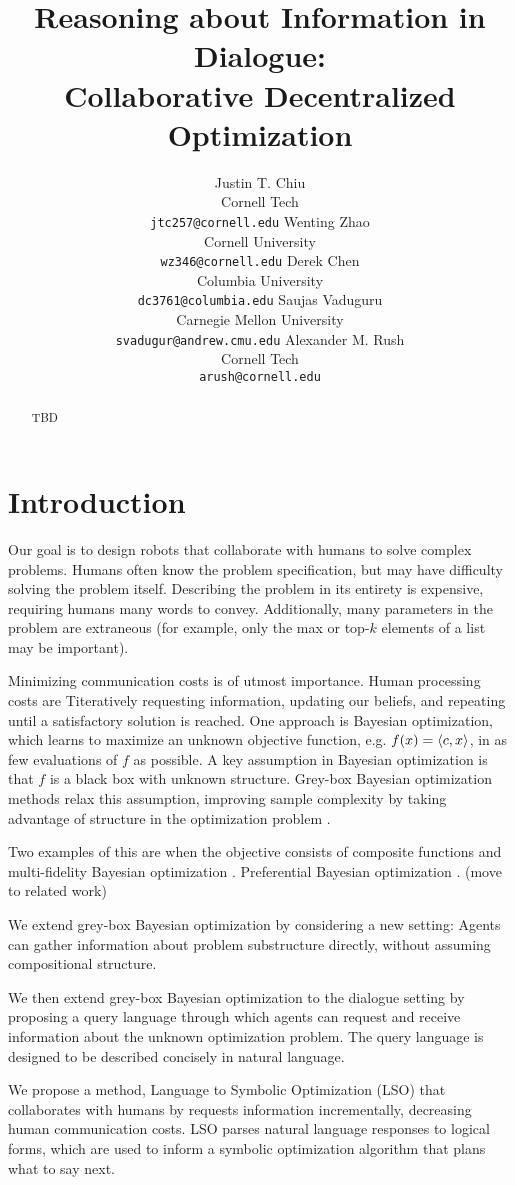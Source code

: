\documentclass[11pt]{article}
\title{
Reasoning about Information in Dialogue:\\
Collaborative Decentralized Optimization
}
\author{
Justin T. Chiu  \\
Cornell Tech \\
\texttt{jtc257@cornell.edu}
\And
Wenting Zhao \\
Cornell University \\
\texttt{wz346@cornell.edu}
\And
Derek Chen \\
Columbia University \\
\texttt{dc3761@columbia.edu}
\AND
Saujas Vaduguru \\
Carnegie Mellon University \\
\texttt{svadugur@andrew.cmu.edu}
\And
Alexander M. Rush \\
Cornell Tech \\
\texttt{arush@cornell.edu}
}
\begin{document}
\maketitle

\begin{abstract}
TBD
\end{abstract}

\section{Introduction}
Our goal is to design robots that collaborate with humans to solve complex problems.
Humans often know the problem specification, but may have difficulty solving the problem itself.
Describing the problem in its entirety is expensive, requiring humans many words to convey.
Additionally, many parameters in the problem are extraneous (for example, only the max or top-$k$ elements of a list may be important).

Minimizing communication costs is of utmost importance.
Human processing costs are 
Titeratively requesting information, updating our beliefs, and repeating until a satisfactory solution is reached.
One approach is Bayesian optimization, which learns to maximize an unknown objective function,
e.g. $f(x) = \left\langle c,x\right\rangle$, in as few evaluations of $f$ as possible.
A key assumption in Bayesian optimization is that $f$ is a black box with unknown structure.
Grey-box Bayesian optimization methods relax this assumption, improving sample complexity by taking advantage of structure in the optimization problem \citep{grey-box-bayesopt}.

Two examples of this are when the objective consists of composite functions \citep{astudillo2019bayesian} and multi-fidelity Bayesian optimization \citep{poloczek2016multiinformation,Zanjani_Foumani_2023}. 
Preferential Bayesian optimization \citep{astudillo2023qeubo}. (move to related work)

We extend grey-box Bayesian optimization by considering a new setting:
Agents can gather information about problem substructure directly, without assuming compositional structure.

We then extend grey-box Bayesian optimization to the dialogue setting by proposing a query language through which agents can request and receive information about the unknown optimization problem.
The query language is designed to be described concisely in natural language.

We propose a method, Language to Symbolic Optimization (LSO) that collaborates with humans by requests information incrementally, decreasing human communication costs.
LSO parses natural language responses to logical forms, which are used to inform a symbolic optimization algorithm that plans what to say next.
\end{document}
